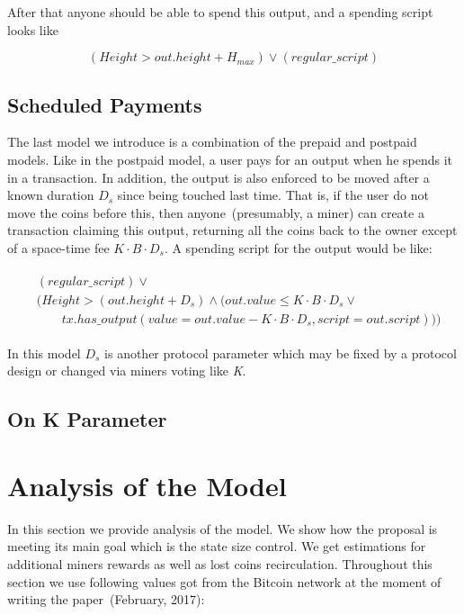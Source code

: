 \documentclass[]{llncs}   %
\newcommand{\authnote}[2]{\marginpar{\parbox{\marginparwidth}{\tiny %
  \textsf{#1 {\textcolor{blue}{notes: #2}}}}}%
  \textcolor{blue}{\textbf{\dag}}}
\newcommand{\authnote}[2]{
  \textsf{#1 \textcolor{blue}{: #2}}}
\newcommand{\authnote}[2]{}
\newcommand{\knote}[1]{{\authnote{\textcolor{green}{Alex notes}}{#1}}}
\begin{document}
After that anyone should be able to spend this output, and a spending script looks like

\begin{equation}
(Height > out.height + H_{max}) \lor (regular\_script)
\end{equation}


\subsection{Scheduled Payments}
\label{sec-scheduled}

The last model we introduce is a combination of the prepaid and postpaid models. Like in the postpaid model, a user pays for an output when he spends it in a transaction. In addition, the output is also enforced to be moved after a known duration $D_{s}$ since being touched last time. That is, if the user do not move the coins before this, then anyone~(presumably, a miner) can create a transaction claiming this output, returning all the coins back to the owner except of a space-time fee ${K \cdot B \cdot D_{s}}$. A spending script for the output would be like:

\begin{align}
\begin{split}
&(regular\_script) \lor \\
&(Height > (out.height + D_s) \land (out.value \le K \cdot B \cdot D_s \lor \\  
&\qquad tx.has\_output(value = out.value - K \cdot B \cdot D_s, script = out.script)))
\end{split}
\end{align}

In this model $D_s$ is another protocol parameter which may be fixed by a protocol design or changed via miners voting like \textit{K}.

\subsection{On K Parameter}
\label{sec-kparameter}

\knote{todo: choose proper title for the sub-section and fill the description}


\section{Analysis of the Model}
\label{sec:analysis}

In this section we provide analysis of the model. We show how the proposal is meeting its main goal which is the state size control. We get estimations for additional miners rewards as well as lost coins recirculation. Throughout this section we use following values got from the Bitcoin network at the moment of writing the paper~(February, 2017):
\end{document}
